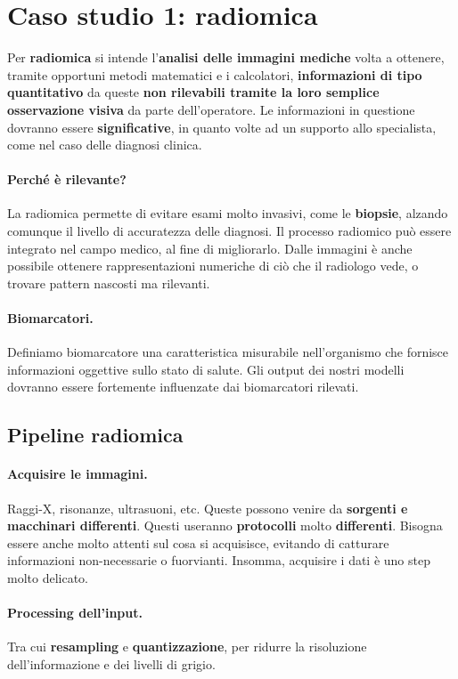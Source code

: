 \section{Caso studio 1: radiomica}
Per \textbf{radiomica} si intende l'\textbf{analisi delle immagini mediche} volta a ottenere, tramite opportuni metodi matematici e i calcolatori, \textbf{informazioni di tipo quantitativo} da queste \textbf{non rilevabili tramite la loro semplice osservazione visiva} da parte dell'operatore.
Le informazioni in questione dovranno essere \textbf{significative}, in quanto volte ad un supporto allo specialista, come nel caso delle diagnosi clinica.

\paragraph{Perché è rilevante?}
La radiomica permette di evitare esami molto invasivi, come le \textbf{biopsie}, alzando comunque il livello di accuratezza delle diagnosi. Il processo radiomico può essere integrato nel campo medico, al fine di migliorarlo. Dalle immagini è anche possibile ottenere rappresentazioni numeriche di ciò che il radiologo vede, o trovare pattern nascosti ma rilevanti.

\paragraph{Biomarcatori.}
Definiamo biomarcatore una caratteristica misurabile nell'organismo che fornisce informazioni oggettive sullo stato di salute. Gli output dei nostri modelli dovranno essere fortemente influenzate dai biomarcatori rilevati.

\subsection{Pipeline radiomica}

\paragraph{Acquisire le immagini.} Raggi-X, risonanze, ultrasuoni, etc. Queste possono venire da \textbf{sorgenti e macchinari differenti}. Questi useranno \textbf{protocolli} molto \textbf{differenti}. Bisogna essere anche molto attenti sul cosa si acquisisce, evitando di catturare informazioni non-necessarie o fuorvianti. Insomma, acquisire i dati è uno step molto delicato.

\paragraph{Processing dell'input.} Tra cui \textbf{resampling} e \textbf{quantizzazione}, per ridurre la risoluzione dell'informazione e dei livelli di grigio.

